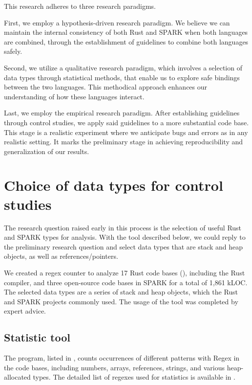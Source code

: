 \documentclass[nomenclature, english, bibtex]{kththesis}
\begin{document}
This research adheres to three research paradigms.

First, we employ a hypothesis-driven research paradigm. We believe we can maintain the internal consistency of both Rust and SPARK when both languages are combined, through the establishment of guidelines to combine both languages safely. 

Second, we utilize a qualitative research paradigm, which involves a selection of data types through statistical methods, that enable us to explore safe bindings between the two languages. This methodical approach enhances our understanding of how these languages interact.

Last, we employ the empirical research paradigm. After establishing guidelines  through control studies, we apply said guidelines to a more substantial code base. This stage is a realistic experiment where we anticipate bugs and errors as in any realistic setting. It marks the preliminary stage in achieving reproducibility and generalization of our results.

\section{Choice of data types for control studies}
\label{sec:dataCollection}

The research question raised early in this process is the selection of useful Rust and SPARK types for analysis. 
With the tool described below, we could reply to the preliminary research question and select data types that are stack and heap objects, as well as references/pointers. 

We created a regex counter to analyze 17 Rust code bases (), including the Rust compiler, and three open-source code bases in SPARK for a total of 1,861 k\gls{LOC}. The selected data types are a series of stack and heap objects, which the Rust and SPARK projects commonly used. The usage of the tool was completed by expert advice.

\subsection{Statistic tool}
\label{sec:stats}


The program, listed in , counts occurrences of different patterns with Regex in the code bases, including numbers, arrays, references, strings, and various heap-allocated types. The detailed list of regexes used for statistics is available in .
\end{document}
